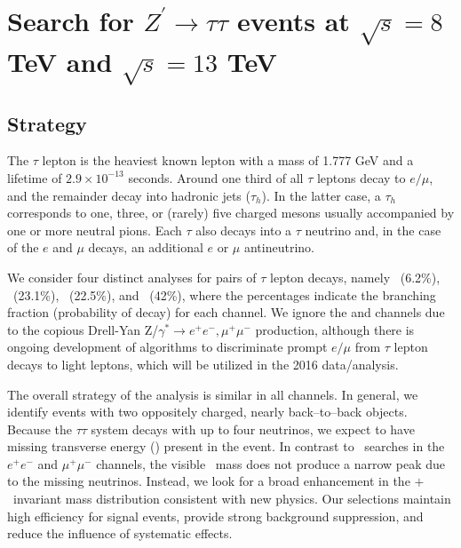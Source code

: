 \chapter{Search for $Z^{\prime}\to\tau\tau$ events at $\sqrt{s} = 8$ TeV and $\sqrt{s} = 13$ TeV}

\section{Strategy}\label{sec:strategy}
The $\tau$ lepton is the heaviest known lepton with a mass of 1.777 GeV and a lifetime of $2.9\times10^{-13}$ seconds. Around one third of
all $\tau$ leptons decay to $e/\mu$, and the remainder decay into hadronic jets ($\tau_{h}$). 
In the latter case, a $\tau_{h}$ corresponds to one, three, or (rarely) five charged mesons usually accompanied by one or
more neutral pions. Each $\tau$ also decays into a $\tau$ neutrino and, in the case of the $e$ and $\mu$ decays, an additional $e$ or $\mu$ antineutrino.

We consider four distinct analyses for pairs of $\tau$ lepton decays, namely \emu ~(6.2\%), \etau ~(23.1\%), \mutau  ~(22.5\%), and
\ditauhad ~(42\%), where the percentages indicate the branching fraction (probability of decay) for each channel. We ignore the \EE and \MM channels due to the copious Drell-Yan
Z/$\gamma^*\rightarrow e^+e^-, \mu^+\mu^-$ production, although there is ongoing development of algorithms to discriminate prompt $e/\mu$ from $\tau$ lepton 
decays to light leptons, which will be utilized in the 2016 data/analysis.

The overall strategy of the analysis is similar in all channels. 
In general, we identify events with two oppositely charged, nearly back--to--back objects. Because the $\tau\tau$ system decays with up to four neutrinos, we expect to have missing transverse energy (\MET) present in the event. In contrast to \zprime ~searches in the $e^+e^-$ and $\mu^+\mu^-$ channels, the visible \ditau ~mass does not produce a narrow peak due to the missing neutrinos. Instead, we look for a broad enhancement in the \ditau$+$\MET ~invariant mass distribution consistent with new physics.  Our selections maintain high efficiency for signal events, provide strong background suppression, and reduce the influence of systematic effects.  

